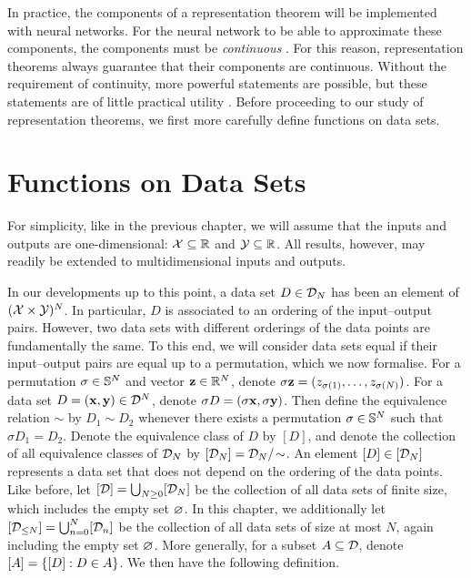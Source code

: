 \documentclass[12pt, twoside]{report}
\begin{document}
In practice, the components of a representation theorem will be implemented with neural networks.
For the neural network to be able to approximate these components,
the components must be \emph{continuous} \parencite{Cybenko:1989:Approximation_by_Superpositions_of_a}.
For this reason, representation theorems always guarantee that their components are continuous.
Without the requirement of continuity, more powerful statements are possible, but these statements are of little practical utility \parencite[Section 3;][]{Wagstaff:2019:On_the_Limitations_of_Representing}.
Before proceeding to our study of representation theorems, we first more carefully define functions on data sets.

\section{Functions on Data Sets}
\label{sec:repr_theorems:functions}
For simplicity, like in the previous chapter, we will assume that the inputs and outputs are one-dimensional: $\mathcal{X} \subseteq \mathbb{R}$ and $\mathcal{Y} \subseteq \mathbb{R}$.
All results, however, may readily be extended to multidimensional inputs and outputs.

In our developments up to this point, a data set $D \in \mathcal{D}_N$ has been an element of $(\mathcal{X} \times \mathcal{Y})^N$.
In particular, $D$ is associated to an ordering of the input--output pairs.
However, two data sets with different orderings of the data points are fundamentally the same.
To this end, we will consider data sets equal if their input--output pairs are equal up to a permutation, which we now formalise.
For a permutation $\sigma \in \mathbb{S}^N$ and vector $\mathbf{z} \in \mathbb{R}^N$, denote
$
    \sigma \mathbf{z} = (z_{\sigma(1)}, \ldots, z_{\sigma(N)})
$.
For a data set $D = (\mathbf{x}, \mathbf{y}) \in \mathcal{D}^N$, denote $\sigma D = (\sigma \mathbf{x}, \sigma \mathbf{y})$.
Then define the equivalence relation $\sim$ by $D_1 \sim D_2$ whenever there exists a permutation $\sigma \in \mathbb{S}^N$ such that $\sigma D_1 = D_2$.
Denote the equivalence class of $D$ by $[D]$, and denote the collection of all equivalence classes of $\mathcal{D}_N$ by $[\mathcal{D}_N] = \mathcal{D}_N /\!\sim$.
An element $[D] \in [\mathcal{D}_N]$ represents a data set that does not depend on the ordering of the data points.
Like before, let $[\mathcal{D}] = \bigcup_{N \ge 0} [\mathcal{D}_N]$ be the collection of all data sets of finite size, which includes the empty set $\varnothing$.
In this chapter, we additionally let $[\mathcal{D}_{\le N}] = \bigcup_{n=0}^N [\mathcal{D}_{n}]$ be the collection of all data sets of size at most $N$, again including the empty set $\varnothing$.
More generally, for a subset $A \subseteq \mathcal{D}$, denote $[A] = \{[D] : D \in A\}$.
We then have the following definition.
\end{document}
